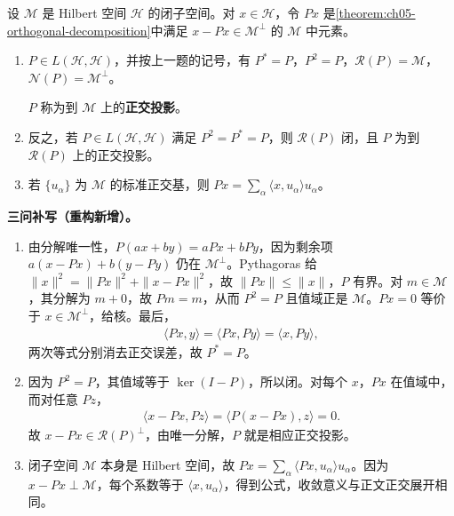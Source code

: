 \documentclass[../../main.tex]{subfiles}
\begin{document}
\begin{exercise}\label{exercise:ch05-orthogonal-projection}
设 $\mathscr M$ 是 Hilbert 空间 $\mathscr H$ 的闭子空间。对 $x\in\mathscr H$，令 $Px$ 是\cref{theorem:ch05-orthogonal-decomposition}中满足 $x-Px\in\mathscr M^\perp$ 的 $\mathscr M$ 中元素。
\begin{enumerate}
\item\label{item:ch05-orthogonal-projection-properties} $P\in L(\mathscr H,\mathscr H)$，并按上一题的记号，有 $P^*=P$，$P^2=P$，$\mathscr R(P)=\mathscr M$，$\mathscr N(P)=\mathscr M^\perp$。
\begin{definition*}[正交投影]\label{definition:ch05-orthogonal-projection}
$P$ 称为到 $\mathscr M$ 上的\textbf{正交投影}。
\end{definition*}
\item\label{item:ch05-self-adjoint-idempotent} 反之，若 $P\in L(\mathscr H,\mathscr H)$ 满足 $P^2=P^*=P$，则 $\mathscr R(P)$ 闭，且 $P$ 为到 $\mathscr R(P)$ 上的正交投影。
\item\label{item:ch05-projection-basis-expansion} 若 $\{u_\alpha\}$ 为 $\mathscr M$ 的标准正交基，则 $Px=\sum_\alpha\langle x,u_\alpha\rangle u_\alpha$。
\end{enumerate}
\end{exercise}
\begin{solution}
\textbf{三问补写（重构新增）。}
\begin{enumerate}
\item 由分解唯一性，$P(ax+by)=aPx+bPy$，因为剩余项 $a(x-Px)+b(y-Py)$ 仍在 $\mathscr M^\perp$。Pythagoras 给 $\|x\|^2=\|Px\|^2+\|x-Px\|^2$，故 $\|Px\|\leqslant\|x\|$，$P$ 有界。对 $m\in\mathscr M$，其分解为 $m+0$，故 $Pm=m$，从而 $P^2=P$ 且值域正是 $\mathscr M$。$Px=0$ 等价于 $x\in\mathscr M^\perp$，给核。最后，
\begin{align*}
\langle Px,y\rangle=\langle Px,Py\rangle=\langle x,Py\rangle,
\end{align*}
两次等式分别消去正交误差，故 $P^*=P$。
\item 因为 $P^2=P$，其值域等于 $\ker(I-P)$，所以闭。对每个 $x$，$Px$ 在值域中，而对任意 $Pz$，
\begin{align*}
\langle x-Px,Pz\rangle=\langle P(x-Px),z\rangle=0.
\end{align*}
故 $x-Px\in\mathscr R(P)^\perp$，由唯一分解，$P$ 就是相应正交投影。
\item 闭子空间 $\mathscr M$ 本身是 Hilbert 空间，故 $Px=\sum_\alpha\langle Px,u_\alpha\rangle u_\alpha$。因为 $x-Px\perp\mathscr M$，每个系数等于 $\langle x,u_\alpha\rangle$，得到公式，收敛意义与正文正交展开相同。
\end{enumerate}
\end{solution}
\end{document}
